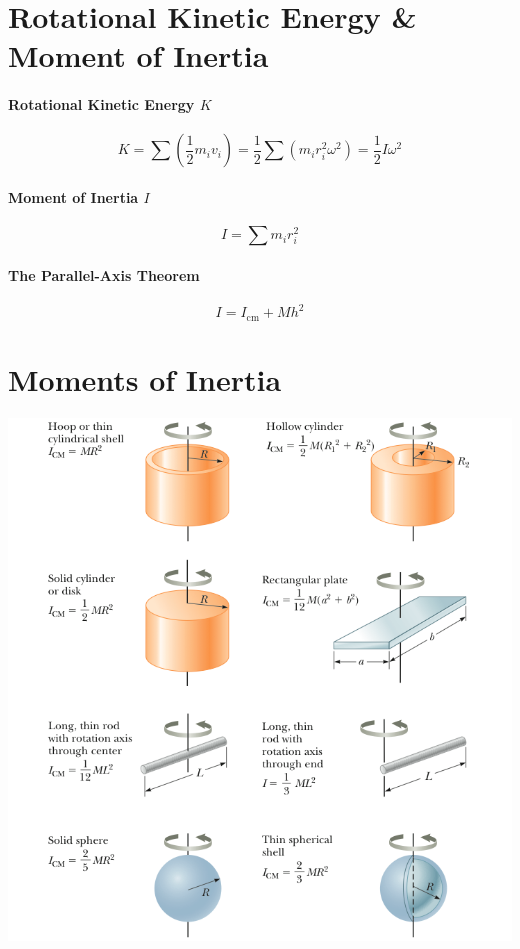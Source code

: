 \documentclass[11pt,letter]{report}
\begin{document}
\section{Rotational Kinetic Energy \& Moment of Inertia}
\paragraph{Rotational Kinetic Energy $K$}
$$K = \sum \left(\frac{1}{2}m_iv_i\right) = \frac{1}{2}\sum \left(m_ir_i^2\omega^2\right) = \frac{1}{2}I\omega^2$$

\paragraph{Moment of Inertia $I$}
$$I = \sum m_ir_i^2$$

\paragraph{The Parallel-Axis Theorem}
$$I = I_\text{cm} + Mh^2$$

\section{Moments of Inertia}
\includegraphics[height=0.5\textheight]{inertia.png}
\end{document}
